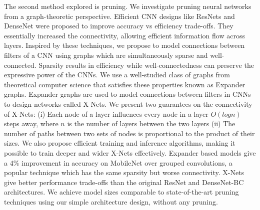 \noindent The second method explored is pruning. We investigate pruning neural networks from a graph-theoretic perspective. Efficient CNN designs like ResNets and DenseNet were proposed to improve accuracy vs efficiency trade-offs. They essentially increased the connectivity, allowing efficient information flow across layers. Inspired by these techniques, we propose to model connections between filters of a CNN using graphs which are simultaneously sparse and well-connected. Sparsity results in efficiency while well-connectedness can preserve the expressive power of the CNNs. We use a well-studied class of graphs from theoretical computer science that satisfies these properties known as Expander graphs. Expander graphs are used to model connections between filters in CNNs to design networks called X-Nets. We present two guarantees on the connectivity of X-Nets: (i) Each node of a layer influences every node in a layer $O(logn)$ steps away, where $n$ is the number of layers between the two layers (ii) The number of paths between two sets of nodes is proportional to the product of their sizes. We also propose efficient training and inference algorithms, making it possible to train deeper and wider X-Nets effectively. Expander based models give a 4\% improvement in accuracy on MobileNet over grouped convolutions, a popular technique which has the same sparsity but worse connectivity. X-Nets give better performance trade-offs than the original ResNet and DenseNet-BC architectures. We achieve model sizes comparable to state-of-the-art pruning techniques using our simple architecture design, without any pruning. 